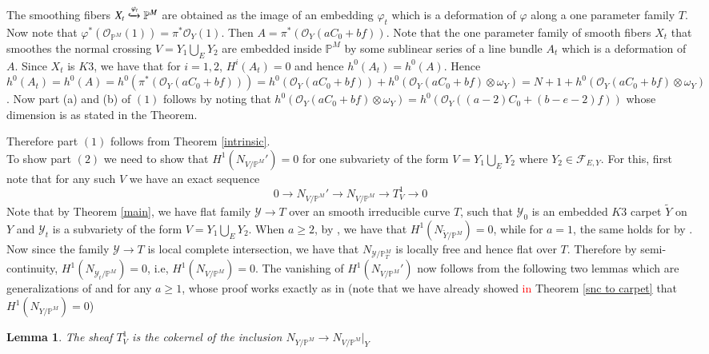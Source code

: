 \documentclass[11pt,twoside]{amsart}
\theoremstyle{plain}
\numberwithin{equation}{section}
\newtheorem{lemma}[theorem]{Lemma}
\theoremstyle{definition}
\begin{document}
The smoothing fibers $X_t \xhookrightarrow{\varphi_t} \mathbb{P}^M$ are obtained as the image of an embedding $\varphi_t$ which is a deformation of $\varphi$ along a one parameter family $T$. Now note that $\varphi^* (\mathcal{O}_{\mathbb{P}^M}(1)) = \pi^*\mathcal{O}_Y(1)$. Then $A = \pi^*(\mathcal{O}_Y(aC_0+bf))$. Note that the one parameter family of smooth fibers $X_t$ that smoothes the normal crossing $V = Y_1 \bigcup_E Y_2$ are embedded inside $\mathbb{P}^M$ by some sublinear series of a line bundle $A_t$ which is a deformation of $A$. Since $X_t$ is $K3$, we have that for $i = 1,2$, $H^i(A_t) = 0$ and hence $h^0(A_t) = h^0(A)$. Hence $h^0(A_t) = h^0(A) = h^0(\pi^*(\mathcal{O}_Y(aC_0+bf))) = h^0(\mathcal{O}_Y(aC_0+bf))+h^0(\mathcal{O}_Y(aC_0+bf) \otimes \omega_Y) = N+1+h^0(\mathcal{O}_Y(aC_0+bf) \otimes \omega_Y)$. Now part (a) and (b) of $(1)$ follows by noting that $h^0(\mathcal{O}_Y(aC_0+bf) \otimes \omega_Y) = h^0(\mathcal{O}_Y((a-2)C_0+(b-e-2)f))$ whose dimension is as stated in the Theorem.

Therefore part $(1)$ follows from Theorem \ref{intrinsic}. \\
To show part $(2)$ we need to show that $H^1(N_{V/\mathbb{P}^M}') = 0$ for one subvariety of the form $V = Y_1 \bigcup_E Y_2$ where $Y_2 \in \mathcal{F}_{E,Y}$. For this, first note that for any such $V$ we have an exact sequence 
$$0 \to N_{V/\mathbb{P}^M}' \to N_{V/\mathbb{P}^M} \to T_V^1 \to 0$$
Note that by Theorem \ref{main}, we have flat family $\mathcal{Y} \to T$ over an smooth irreducible curve $T$, such that $\mathcal{Y}_0$ is an embedded $K3$ carpet $\widetilde{Y}$ on $Y$ and $\mathcal{Y}_t$ is a subvariety of the form $V = Y_1 \bigcup_E Y_2$. When $a \geq 2$, by \cite[Theorem $5.1$, equation $(5.9)$]{PMR21}, we have that $H^1(N_{\widetilde{Y}/\mathbb{P}^M}) = 0$, while for $a = 1$, the same holds for by \cite[Theorem $4.1$]{GP97}. Now since the family $\mathcal{Y} \to T$ is local complete intersection, we have that $N_{\mathcal{Y}/\mathbb{P}_T^M}$ is locally free and hence flat over $T$. Therefore by semi-continuity, $H^1(N_{\mathcal{Y}_t/\mathbb{P}^M}) = 0$, i.e, $H^1(N_{V/\mathbb{P}^M}) = 0$. The vanishing of $H^1(N_{V/\mathbb{P}^M}')$ now follows from the following two lemmas which are generalizations of \cite[Lemma $(2)$]{CLM93} and \cite[Corollary $(1)$]{CLM93} for any $a \geq 1$, whose proof works exactly as in \cite{CLM93} (note that we have already showed \textcolor{red}{in} Theorem \ref{snc to carpet} that $H^1(N_{Y/\mathbb{P}^M}) = 0$)  
\begin{lemma}\label{alternate T^1}
The sheaf $T_V^1$ is the cokernel of the inclusion $N_{Y/\mathbb{P}^M} \to N_{V/\mathbb{P}^M}|_Y$
\end{lemma}
\end{document}
